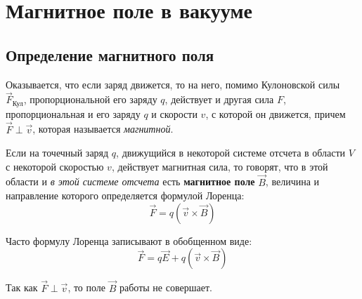  \chapter{Магнитное поле в вакууме}

\section{Определение магнитного поля}
\label{sec8.1}

    Оказывается, что если заряд движется, то на него, помимо Кулоновской силы
    \( \vec{F}_\textit{Кул} \), пропорциональной его заряду \( q \), действует
    и другая сила \( F \), пропорциональная и его заряду \( q \) и скорости
    \( v \), с которой он движется, причем \( \vec{F} \perp \vec{v} \), которая
    называется \textit{магнитной}.
    
    \begin{definition}
        Если на точечный заряд \( q \), движущийся в некоторой системе отсчета 
        в области \( V \) с некоторой скоростью \( v \), действует магнитная
        сила, то говорят, что в этой области и \textit{в этой системе отсчета}
        есть \textbf{магнитное поле} \( \vec{B} \), величина и направление
        которого определяется формулой Лоренца:
        \begin{equation}
            \vec{F} = q(\vec{v} \times \vec{B})
            \label{eq8:1}
        \end{equation}
    \end{definition}
    
    \begin{remark}
        Часто формулу Лоренца записывают в обобщенном виде:
        \begin{equation}
            \vec{F} = q\vec{E} + q(\vec{v} \times \vec{B})
            \label{eq8:1a}
        \end{equation}
    \end{remark}
    
    \begin{remark}
        Так как \( \vec{F} \perp \vec{v} \), то поле \( \vec{B} \) работы не
        совершает.
    \end{remark}
   
